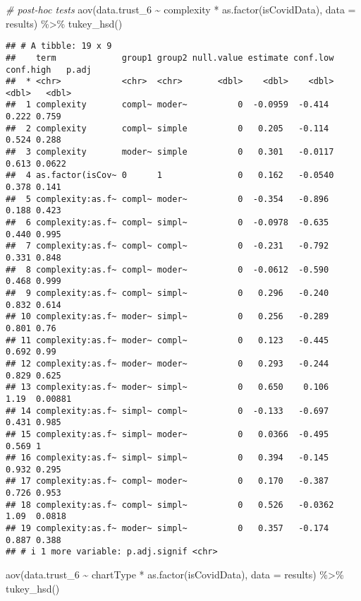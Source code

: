 \documentclass[
]{article}
\newenvironment{Shaded}{\begin{snugshade}}{\end{snugshade}}
\newcommand{\AttributeTok}[1]{\textcolor[rgb]{0.77,0.63,0.00}{#1}}
\newcommand{\CommentTok}[1]{\textcolor[rgb]{0.56,0.35,0.01}{\textit{#1}}}
\newcommand{\FunctionTok}[1]{\textcolor[rgb]{0.00,0.00,0.00}{#1}}
\newcommand{\NormalTok}[1]{#1}
\newcommand{\SpecialCharTok}[1]{\textcolor[rgb]{0.00,0.00,0.00}{#1}}
\begin{document}
\begin{Shaded}
\begin{Highlighting}[]
\CommentTok{\# post{-}hoc tests}
\FunctionTok{aov}\NormalTok{(data.trust\_6 }\SpecialCharTok{\textasciitilde{}}\NormalTok{ complexity }\SpecialCharTok{*} \FunctionTok{as.factor}\NormalTok{(isCovidData), }\AttributeTok{data =}\NormalTok{ results) }\SpecialCharTok{\%\textgreater{}\%} \FunctionTok{tukey\_hsd}\NormalTok{()}
\end{Highlighting}
\end{Shaded}

\begin{verbatim}
## # A tibble: 19 x 9
##    term             group1 group2 null.value estimate conf.low conf.high   p.adj
##  * <chr>            <chr>  <chr>       <dbl>    <dbl>    <dbl>     <dbl>   <dbl>
##  1 complexity       compl~ moder~          0  -0.0959  -0.414      0.222 0.759  
##  2 complexity       compl~ simple          0   0.205   -0.114      0.524 0.288  
##  3 complexity       moder~ simple          0   0.301   -0.0117     0.613 0.0622 
##  4 as.factor(isCov~ 0      1               0   0.162   -0.0540     0.378 0.141  
##  5 complexity:as.f~ compl~ moder~          0  -0.354   -0.896      0.188 0.423  
##  6 complexity:as.f~ compl~ simpl~          0  -0.0978  -0.635      0.440 0.995  
##  7 complexity:as.f~ compl~ compl~          0  -0.231   -0.792      0.331 0.848  
##  8 complexity:as.f~ compl~ moder~          0  -0.0612  -0.590      0.468 0.999  
##  9 complexity:as.f~ compl~ simpl~          0   0.296   -0.240      0.832 0.614  
## 10 complexity:as.f~ moder~ simpl~          0   0.256   -0.289      0.801 0.76   
## 11 complexity:as.f~ moder~ compl~          0   0.123   -0.445      0.692 0.99   
## 12 complexity:as.f~ moder~ moder~          0   0.293   -0.244      0.829 0.625  
## 13 complexity:as.f~ moder~ simpl~          0   0.650    0.106      1.19  0.00881
## 14 complexity:as.f~ simpl~ compl~          0  -0.133   -0.697      0.431 0.985  
## 15 complexity:as.f~ simpl~ moder~          0   0.0366  -0.495      0.569 1      
## 16 complexity:as.f~ simpl~ simpl~          0   0.394   -0.145      0.932 0.295  
## 17 complexity:as.f~ compl~ moder~          0   0.170   -0.387      0.726 0.953  
## 18 complexity:as.f~ compl~ simpl~          0   0.526   -0.0362     1.09  0.0818 
## 19 complexity:as.f~ moder~ simpl~          0   0.357   -0.174      0.887 0.388  
## # i 1 more variable: p.adj.signif <chr>
\end{verbatim}

\begin{Shaded}
\begin{Highlighting}[]
\FunctionTok{aov}\NormalTok{(data.trust\_6 }\SpecialCharTok{\textasciitilde{}}\NormalTok{ chartType }\SpecialCharTok{*} \FunctionTok{as.factor}\NormalTok{(isCovidData), }\AttributeTok{data =}\NormalTok{ results) }\SpecialCharTok{\%\textgreater{}\%} \FunctionTok{tukey\_hsd}\NormalTok{()}
\end{Highlighting}
\end{Shaded}
\end{document}
